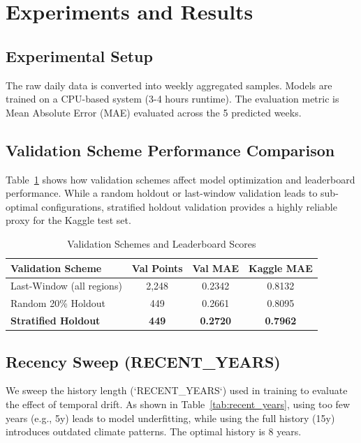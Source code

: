 \documentclass[conference]{IEEEtran}
\begin{document}
\section{Experiments and Results}

\subsection{Experimental Setup}
The raw daily data is converted into weekly aggregated samples. Models are trained on a CPU-based system (3-4 hours runtime). The evaluation metric is Mean Absolute Error (MAE) evaluated across the 5 predicted weeks.

\subsection{Validation Scheme Performance Comparison}
Table~\ref{tab:val_schemes} shows how validation schemes affect model optimization and leaderboard performance. While a random holdout or last-window validation leads to sub-optimal configurations, stratified holdout validation provides a highly reliable proxy for the Kaggle test set.

\begin{table}[htbp]
\caption{Validation Schemes and Leaderboard Scores}
\begin{center}
\begin{tabular}{lccc}
\toprule
\textbf{Validation Scheme} & \textbf{Val Points} & \textbf{Val MAE} & \textbf{Kaggle MAE} \\
\midrule
Last-Window (all regions)  & 2,248 & 0.2342 & 0.8132 \\
Random 20\% Holdout        & 449   & 0.2661 & 0.8095 \\
\textbf{Stratified Holdout} & \textbf{449} & \textbf{0.2720} & \textbf{0.7962} \\
\bottomrule
\end{tabular}
\label{tab:val_schemes}
\end{center}
\end{table}

\subsection{Recency Sweep (RECENT\_YEARS)}
We sweep the history length (`RECENT\_YEARS`) used in training to evaluate the effect of temporal drift. As shown in Table~\ref{tab:recent_years}, using too few years (e.g., 5y) leads to model underfitting, while using the full history (15y) introduces outdated climate patterns. The optimal history is 8 years.
\end{document}
